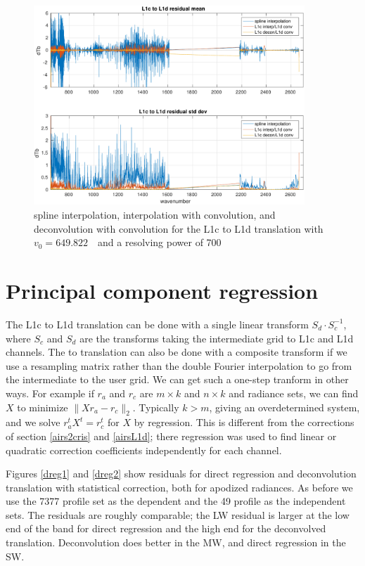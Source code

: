 \documentclass[11pt]{article}
\begin{document}
\begin{figure} %
  \centering
  \includegraphics[height=7.5cm]{figures/CtoD_interp_diff.pdf}
  \caption{spline interpolation, interpolation with convolution, 
    and deconvolution with convolution for the {\airs} L1c to L1d
    translation with $v_0=649.822$~\wn\ and a resolving power of 700}
  \label{interpL1d}
\end{figure}

\FloatBarrier
\section{Principal component regression}
\label{dregr}

The {\airs} L1c to L1d translation can be done with a single linear
transform $S_d\cdot S_c^{-1}$, where $S_c$ and $S_d$ are the
transforms taking the intermediate grid to L1c and L1d channels.
The {\airs} to {\cris} translation can also be done with a composite
transform if we use a resampling matrix rather than the double
Fourier interpolation to go from the intermediate to the {\cris}
user grid.  We can get such a one-step tranform in other ways.  For
example if $r_a$ and $r_c$ are $m \times k$ and $n \times k$ {\airs}
and {\cris} radiance sets, we can find $X$ to minimize $\|X r_a -
r_c\|_2$.  Typically $k > m$, giving an overdetermined system, and
we solve $r_a^t X^t = r_c^t$ for $X$ by regression.  This is
different from the corrections of section \ref{airs2cris} and
\ref{airsL1d}; there regression was used to find linear or quadratic
correction coefficients independently for each channel.

Figures \ref{dreg1} and \ref{dreg2} show residuals for direct
regression and deconvolution translation with statistical
correction, both for apodized radiances.  As before we use the 7377
profile set as the dependent and the 49 profile as the independent
sets.  The residuals are roughly comparable; the LW residual is
larger at the low end of the band for direct regression and the high
end for the deconvolved translation.  Deconvolution does better in
the MW, and direct regression in the SW.
\end{document}
